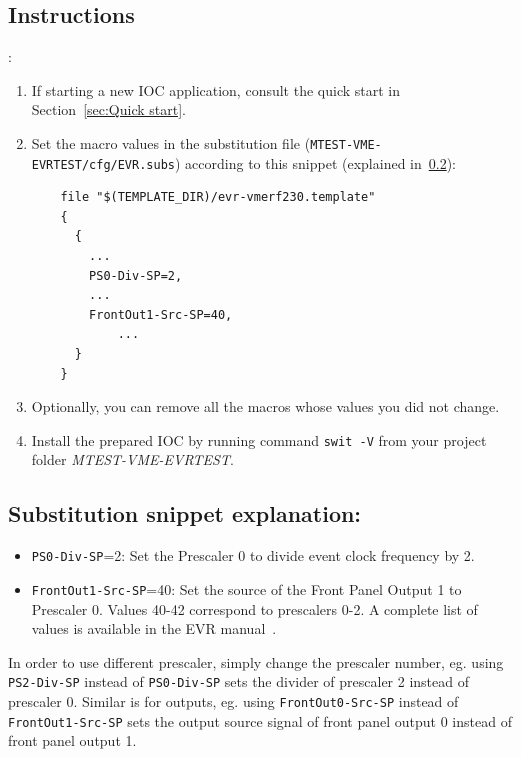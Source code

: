 \documentclass[12pt,a4paper]{article}
\begin{document}
\subsection{Instructions}:
\begin{enumerate}
	\item If starting a new IOC application, consult the quick start in Section~\ref{sec:Quick start}.

	\item Set the macro values in the substitution file (\texttt{MTEST-VME-EVRTEST/cfg/EVR.subs}) according to this snippet (explained in~\ref{sec:explain_clock}):
\begin{verbatim}
	file "$(TEMPLATE_DIR)/evr-vmerf230.template"
	{
	  {
	    ...
	    PS0-Div-SP=2,
	    ...
	    FrontOut1-Src-SP=40,
		    ...
	  }
	}
\end{verbatim}

	\item Optionally, you can remove all the macros whose values you did not change. 
	\item Install the prepared IOC by running command \texttt{swit -V} from your project folder \textit{MTEST-VME-EVRTEST}.
\end{enumerate}

\subsection{Substitution snippet explanation:}\label{sec:explain_clock}
\begin{itemize}
	\item \texttt{PS0-Div-SP}=2: Set the Prescaler 0 to divide event clock frequency by 2.
	\item \texttt{FrontOut1-Src-SP}=40: Set the source of the Front Panel Output 1 to Prescaler 0. Values 40-42 correspond to prescalers 0-2. A complete list of values is available in the EVR manual~\cite{evr_manual}.
\end{itemize}

In order to use different prescaler, simply change the prescaler number, eg. using \texttt{PS2-Div-SP} instead of \texttt{PS0-Div-SP} sets the divider of prescaler 2 instead of prescaler 0.
Similar is for outputs, eg. using \texttt{FrontOut0-Src-SP} instead of \texttt{FrontOut1-Src-SP} sets the output source signal of front panel output 0 instead of front panel output 1.
\end{document}
